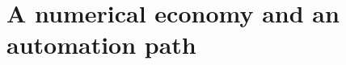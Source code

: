 \documentclass[12pt]{article}
\theoremstyle{plain}
\theoremstyle{definition}
\theoremstyle{remark}
\begin{document}
\section{A numerical economy and an automation path}\label{sec:example}
\end{document}
